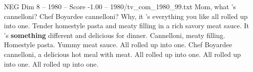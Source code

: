 \begin{textsample}{NEG Dim 8 – 1980 – Score -1.00 – 1980/tv\_com\_1980\_99.txt}  \label{ex:f8_neg_051}
Mom, what 's cannelloni?
Chef Boyardee cannelloni?
Why, it 's everything you like all rolled up into one.
Tender homestyle pasta and meaty filling in a rich savory meat sauce.
It 's \textbf{something} different and delicious for dinner.
Cannelloni, meaty filling.
Homestyle pasta.
Yummy meat sauce.
All rolled up into one.
Chef Boyardee cannelloni, a delicious hot meal with meat.
All rolled up into one.
All rolled up into one.
All rolled up into one.

\end{textsample}

